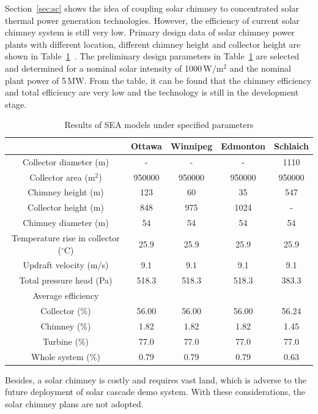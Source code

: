 Section~\ref{sec:sc} shows the idea of coupling solar chimney to concentrated solar thermal power generation technologies.
However, the efficiency of current solar chimney system is still very low. Primary design data of solar chimney power plants with different location, different chimney height and collector height are shown in Table~\ref{tab:sc}~\cite{Bilgen2005}. The preliminary design parameters in Table~\ref{tab:sc} are selected and determined for a nominal solar intensity of 1000$\,\mathrm{W/m^2}$ and the nominal plant power of 5$\,\mathrm{MW}$. From the table, it can be found that the chimney efficiency and total efficiency are very low and the technology is still in the development stage.
\begin{table}[htbp]
	\caption{Results of SEA models under specified parameters}
	\begin{center}
	\begin{tabular}{ccccc}
		\toprule
		&Ottawa    &Winnipeg    &Edmonton    &Schlaich\\
		\midrule
		Collector diameter (m)    &-&-&-&1110 \\
  Collector area ($\mathrm{m^2}$)    & 950000    & 950000&950000&950000\\
  Chimney height (m)    &123    &60    &    35&    547\\
  Collector height (m)    &848    &975    &1024    &    -\\
  Chimney diameter (m)    &54    &54    &54    &54\\
  Temperature rise in collector ($\mathrm{^\circ C}$)    &25.9    &25.9    &25.9    &25.9\\
  Updraft velocity (m/s)&9.1    &9.1    &9.1    &9.1\\
  Total pressure head (Pa)&518.3    &518.3    &518.3    &383.3\\
  Average efficiency\\
  Collector (\%)    &56.00    &56.00    &56.00    &56.24\\
  Chimney (\%)    &1.82    &1.82    &1.82    &1.45\\
  Turbine (\%)    &77.0    &77.0    &77.0    &77.0\\
  Whole system (\%)    &0.79    &0.79    &0.79    &0.63\\
		\bottomrule
	\end{tabular}
	\end{center}
	\label{tab:sc}
\end{table}

Besides, a solar chimney is costly and requires vast land, which is adverse to the future deployment of solar cascade demo system. With these considerations, the solar chimney plans are not adopted. 

